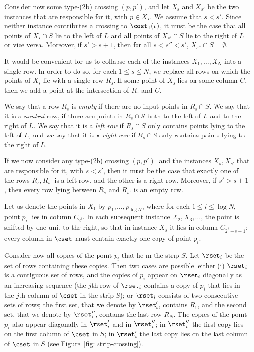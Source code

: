 \documentclass[11pt]{article}
\numberwithin{equation}{section}
\theoremstyle{definition}
\theoremstyle{plain}
\newcommand{\expref}[2]{\hyperref[#2]{#1~\ref{#2}}}
\begin{document}
Consider now some type-(2b) crossing $(p,p')$, and let $X_s$ and $X_{s'}$ be the two instances that are responsible for it, with $p\in X_s$. We assume that $s<s'$. Since neither instance contributes a crossing to $\cost_1(v)$, it must be the case that all points of $X_s\cap S$ lie to the left of $L$ and all points of $X_{s'}\cap S$ lie to the right of $L$ or vice versa.
Moreover, if $s'>s+1$, then for all $s<s''<s'$, $X_{s''}\cap S=\emptyset$.

It would be convenient for us to collapse each of the instances $X_1,\ldots,X_{N}$ into a single row. In order to do so, for each $1\leq s\leq N$, we replace all rows on which the points of $X_s$ lie with a single row $R_s$. If some point of $X_s$ lies on some column $C$, then we add a point at the intersection of $R_s$ and $C$.

We say that a row $R_s$ is \emph{empty} if there are no input points in $R_s\cap S$. We say that it is a \emph{neutral} row, if there are points in $R_s\cap S$ both to the left of $L$ and to the right of $L$. We say that it is a \emph{left row} if $R_s\cap S$ only contains points lying to the left of $L$, and we say that it is a \emph{right row} if $R_s\cap S$ only contains points lying to the right of $L$.

If we now consider any type-(2b) crossing $(p,p')$, and the instances $X_s,X_{s'}$ that are responsible for it, with $s<s'$, then it must be the case that exactly one of the rows $R_s,R_{s'}$ is a left row, and the other is a right row. Moreover, if $s'>s+1$, then every row lying between $R_s$ and $R_{s'}$ is an empty row.

Let us denote the points in $X_1$ by $p_1,\ldots,p_{\log N}$, where for each $1\leq i\leq \log N$, point $p_i$ lies in column $C_{2^i}$. 
In each subsequent instance $X_2,X_3,\ldots$, the point is shifted by one unit to the right, so that in instance $X_s$ it lies in column $C_{2^i+s-1}$; every column in $\cset$ must contain exactly one copy of point $p_i$.

Consider now all copies of the point $p_i$ that lie in the strip $S$. Let $\rset_i$ be the set of rows containing these copies. Then two cases are possible: either (i) $\rset_i$ is a contiguous set of rows, and the copies of $p_i$ appear on $\rset_i$ diagonally as an increasing sequence (the $j$th row of $\rset_i$ contains a copy of $p_i$ that lies in the $j$th column of $\cset$ in the strip $S$); or $\rset_i$ consists of two consecutive sets of rows; the first set, that we denote by $\rset'_i$, contains $R_1$, and the second set, that we denote by $\rset''_i$, contains the last row $R_{N}$. The copies of the point $p_i$ also appear diagonally in $\rset'_i$ and in $\rset''_i$; in $\rset''_i$ the first copy lies on the first column of $\cset$ in $S$; in $\rset'_i$ the last copy lies on the last column of $\cset$ in $S$ (see \expref{Figure}{fig: strip-crossing}).
\end{document}

